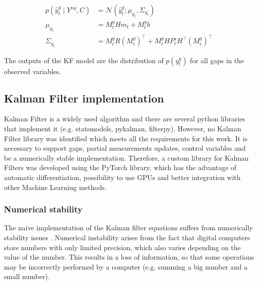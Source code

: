 \documentclass{article}
\newcommand{\norm}[3]{\mathcal{N}\left(#1; #2, #3\right)} %
\let\Oldsubsection\subsection
\renewcommand{\subsection}{\FloatBarrier\Oldsubsection}
\begin{document}
\begin{equation}
\begin{aligned}\label{eq:filter_predictions}
    p(\hat{y}^g_t \mid Y^{ng}, C) &= \norm{\hat{y}^g_t}{\mu_{y_t}}{\Sigma_{y_t}} \\
    \mu_{y_t} &= M^g_tHm_t + M^g_tb \\
    \Sigma_{y_t} &= M^g_tR(M^g_t)^\top + M^g_tHP^s_tH^\top (M^g_t)^\top
\end{aligned}
\end{equation}

The outputs of the KF model are the distribution of $p(y^g_t)$ for all gaps in the observed variables. 

\subsection{Kalman Filter implementation}


Kalman Filter is a widely used algorithm and there are several python libraries that implement it (e.g. \textsf{statsmodels}, \textsf{pykalman}, \textsf{filterpy}). However, no  Kalman Filter library was identified which meets all the requirements for this work. It is necessary to support gaps, partial measurements updates, control variables and be a numerically stable implementation.
Therefore, a custom library for Kalman Filters was developed using the \textsf{PyTorch} library, which has the advantage of automatic differentiation, possibility to use GPUs and better integration with other Machine Learning methods.

\subsubsection{Numerical stability}

The naive implementation of the Kalman filter equations suffers from numerically stability issues \cite{mohinder_s_grewal_kalman_2001, dan_simon_optimal_2006}. %
Numerical instability arises from the fact that digital computers store numbers with only limited precision, which also varies depending on the value of the number. This results in a loss of information, so that some operations may be incorrectly performed by a  computer (e.g. summing a big number and a small number).
\end{document}
